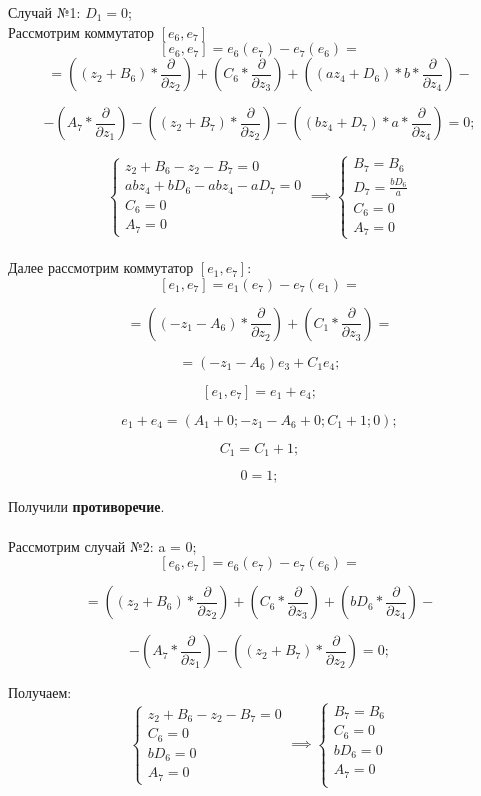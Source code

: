 \href{\href{}{}}{}\documentclass[14pt]{extarticle} %
\begin{document}
Случай №1: $D_1 = 0$; \\
Рассмотрим коммутатор $[e_6, e_7]$
\[
[e_6, e_7] = e_6(e_7) - e_7(e_6) =
\]
\[
= \left((z_2 + B_6) * \frac{\partial}{\partial z_2}\right)
+ \left(C_6 * \frac{\partial}{\partial z_3}\right)
+ \left((az_4 + D_6) * b * \frac{\partial}{\partial z_4}\right) -
\]

\[
- \left(A_7 * \frac{\partial}{\partial z_1}\right)
- \left((z_2 + B_7) * \frac{\partial}{\partial z_2}\right)
- \left((bz_4 + D_7) * a * \frac{\partial}{\partial z_4}\right) = 0;
\]

\[
\begin{cases}
z_2 + B_6 - z_2 - B_7 = 0 \\
abz_4 + bD_6 - abz_4 - aD_7 = 0 \\
C_6 = 0 \\
A_7 = 0
\end{cases}
\implies
\begin{cases}
B_7 = B_6 \\
D_7 = \frac{bD_6}{a} \\
C_6 = 0 \\
A_7 = 0
\end{cases}
\]\\

Далее рассмотрим коммутатор $[e_1, e_7]$:
\[
[e_1, e_7] = e_1(e_7) - e_7(e_1) =
\]

\[
= \left((-z_1 - A_6) * \frac{\partial}{\partial z_2}\right)
+ \left(C_1 * \frac{\partial}{\partial z_3}\right) =
\]

\[
= (-z_1 - A_6)e_3 + C_1e_4;
\]

\[
[e_1, e_7] = e_1 + e_4;
\]

\[
e_1 + e_4 = \left(A_1 + 0; -z_1 - A_6 + 0; C_1 + 1; 0 \right);
\]

\[
C_1 = C_1 + 1;
\]

\[
0 = 1;
\]

Получили \textbf{противоречие}.\\\\
Рассмотрим случай №2: a = 0;
\[
[e_6, e_7] = e_6(e_7) - e_7(e_6) =
\]

\[
= \left( (z_2 + B_6) * \frac{\partial}{\partial z_2} \right)
+ \left( C_6 * \frac{\partial}{\partial z_3} \right)
+ \left( bD_6 * \frac{\partial}{\partial z_4} \right) -
\]

\[
- \left( A_7 * \frac{\partial}{\partial z_1} \right)
- \left( (z_2 + B_7) * \frac{\partial}{\partial z_2} \right) = 0;
\]

Получаем: \\
\[
\begin{cases}
z_2 + B_6 - z_2 - B_7 = 0 \\
C_6 = 0 \\
bD_6 = 0 \\
A_7 = 0
\end{cases}
\implies
\begin{cases}
B_7 = B_6 \\
C_6 = 0 \\
bD_6 = 0 \\
A_7 = 0 \\
\end{cases}
\]\\
\end{document}
